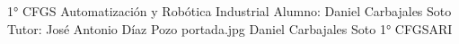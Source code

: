 \documentclass[spanish,openany]{report}
\date{\today}
\begin{document}
{ 1° CFGS Automatización y Robótica Industrial}
{Alumno: Daniel Carbajales Soto\\
	Tutor: José Antonio Díaz Pozo
}
{portada.jpg}
\maketoc
{}
{Daniel Carbajales Soto}
{1° CFGSARI}
%



\end{document}
